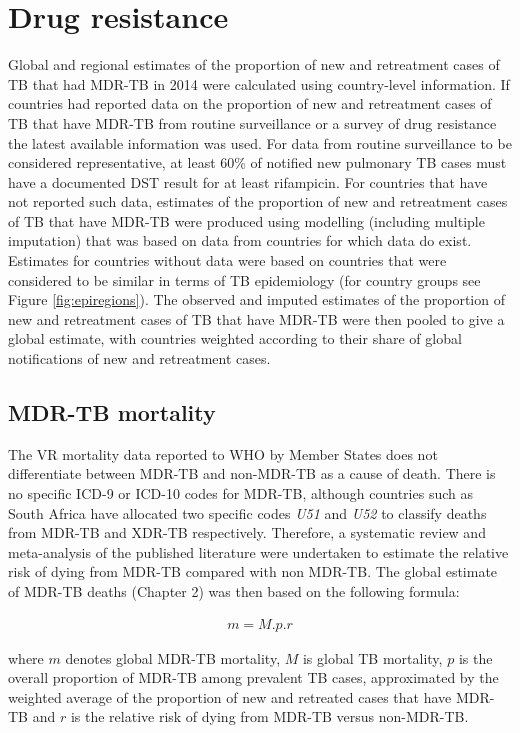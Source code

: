 \section{Drug resistance}

Global and regional estimates of the proportion of new and retreatment cases of TB that had MDR-TB in 2014 were calculated using country-level information. If countries had reported data on the proportion of new and retreatment cases of TB that have MDR-TB from routine surveillance or a survey of drug resistance the latest available information was used. For data from routine surveillance to be considered representative, at least 60\% of notified new pulmonary TB cases must have a documented DST result for at least rifampicin. For countries that have not reported such data, estimates of the proportion of new and retreatment cases of TB that have MDR-TB were produced using modelling (including multiple imputation) that was based on data from countries for which data do exist. Estimates for countries without data were based on countries that were considered to be similar in terms of TB epidemiology (for country groups see Figure \ref{fig:epiregions}). The observed and imputed estimates of the proportion of new and retreatment cases of TB that have MDR-TB were then pooled to give a global estimate, with countries weighted according to their share of global notifications of new and retreatment cases.

\subsection{MDR-TB mortality}

The VR mortality data reported to WHO by Member States does not differentiate between MDR-TB and non-MDR-TB as a cause of death. There is no specific ICD-9 or ICD-10 codes for MDR-TB, although countries such as South Africa have allocated two specific codes \textit{U51} and \textit{U52} to classify deaths from MDR-TB and XDR-TB respectively. Therefore, a systematic review and meta-analysis of the published literature were undertaken to estimate the relative risk of dying from MDR-TB compared with non MDR-TB. The global estimate of MDR-TB deaths (Chapter 2) was then based on the following formula: 

\begin{align*}
m = M.p.r
\end{align*}

where $m$ denotes global MDR-TB mortality, $M$ is global TB mortality, $p$ is the overall proportion of MDR-TB among prevalent TB cases, approximated by the weighted average of the proportion of new and retreated cases that have MDR-TB and $r$ is the relative risk of dying from MDR-TB versus non-MDR-TB.

